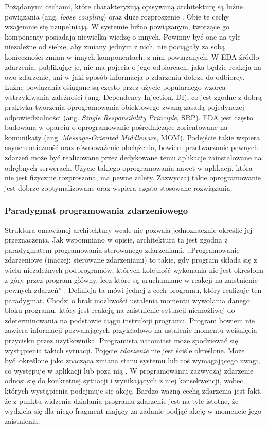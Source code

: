 \documentclass[a4paper]{book}
\newcommand{\obcy}[2]{{\selectlanguage{#1}#2}}
\newcommand{\ang}[1]{\emph{\obcy{british}{#1}}}
\begin{document}
{Pożądanymi cechami, które charakteryzują opisywaną architekturę są luźne powiązania (ang. \ang{loose coupling}) oraz duże rozproszenie \cite{id:EDA_BrendaMichelson}. Obie te cechy wzajemnie się uzupełniają. W systemie luźno powiązanym, tworzące go komponenty posiadają niewielką wiedzę o innych. Powinny być one na tyle niezależne od siebie, aby zmiany jednym z nich, nie pociągały za sobą konieczności zmian w innych komponentach, z nim powiązanych. W EDA źródło zdarzenia, publikując je, nie ma pojęcia o jego odbiorcach, jaka będzie reakcja na owo zdarzenie, ani w jaki sposób informacja o zdarzeniu dotrze do odbiorcy.  Luźne powiązania osiągane są często przez użycie popularnego wzorca wstrzykiwania zależności (ang. Dependency Injection, DI), co jest zgodne z dobrą praktyką tworzenia oprogramowania obiektowego zwaną zasadą pojedynczej odpowiedzialności (ang. \ang{Single Responsibility Principle}, SRP). EDA jest często budowana w oparciu o oprogramowanie pośredniczące zorientowane na komunikaty (ang. \ang{Message-Oriented Middleware}, MOM). Podejście takie wspiera asynchroniczność oraz równoważenie obciążenia, bowiem przetwarzanie pewnych zdarzeń może być realizowane przez dedykowane temu aplikacje zainstalowane na odrębnych serwerach. Użycie takiego oprogramowania nawet w aplikacji, która nie jest fizycznie rozproszona, ma pewne zalety. Zazwyczaj takie oprogramowanie jest dobrze zoptymalizowane oraz wspiera często stosowane rozwiązania.


\subsubsection{Paradygmat programowania zdarzeniowego}

Struktura omawianej architektury wcale nie pozwala jednoznacznie określić jej przeznaczenia. Jak wspomniano w opisie, architektura ta jest zgodna z paradygmatem  programowania sterowanego zdarzeniami. ,,Programowanie zdarzeniowe (inaczej: sterowane zdarzeniami) to takie, gdy program składa się z wielu niezależnych podprogramów, których kolejność wykonania nie jest określona z góry przez program główny, lecz które są uruchamiane w reakcji na zaistnienie pewnych zdarzeń'' \cite{id:bylina}. Definicja ta mówi jednej z cech programu, który realizuje ten paradygmat. Chodzi o brak możliwości ustalenia momentu wywołania danego bloku programu, który jest reakcją na zaistnienie sytuacji niemożliwej do zdeterminowania na podstawie ciągu instrukcji programu. Program bowiem nie zawiera informacji pozwalających przykładowo na ustalenie momentu wciśnięcia przycisku przez użytkownika. Programista natomiast może spodziewać się wystąpienia takich sytuacji. Pojęcie \emph{zdarzenie} nie jest ściśle określone. Może być określone jako znacząca zmiana stanu systemu \cite{id:EDA_GartnerSummit} lub coś wymagającego uwagi, co występuje w aplikacji lub poza nią \cite{id:EDA_BrendaMichelson}. W programowaniu zazwyczaj zdarzenie odnosi się do konkretnej sytuacji i wynikających z niej konsekwencji, wobec których wystąpienia podejmuje się akcję. Bardzo ważną cechą zdarzenia jest fakt, że z punktu widzenia działania programu zdarzenie jest na tyle istotne, że wydziela się dla niego fragment mający za zadanie podjąć akcję w momencie jego zaistnienia.


}
\end{document}
